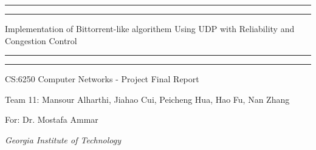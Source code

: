  

\begin{titlepage} %

	\centering %
	
	\scshape %
	
	\vspace*{\baselineskip} %
	
	
	\rule{\textwidth}{1.6pt}\vspace*{-\baselineskip}\vspace*{2pt} %
	\rule{\textwidth}{0.4pt} %
	
	\vspace{0.75\baselineskip} %
	
	{\LARGE Implementation of Bittorrent-like algorithem Using UDP
with Reliability and Congestion Control\\} %
	
	\vspace{0.75\baselineskip} %
	
	\rule{\textwidth}{0.4pt}\vspace*{-\baselineskip}\vspace{3.2pt} %
	\rule{\textwidth}{1.6pt} %
	
	\vspace{2\baselineskip} %
	
	
	CS:6250 Computer Networks - Project Final Report
	
	\vspace*{3\baselineskip} %
	
	
Team 11: Mansour Alharthi, Jiahao Cui, Peicheng Hua, Hao Fu, Nan Zhang	
	
		
	\vspace{2\baselineskip} %
	
	For: Dr. Mostafa Ammar

	
	\vspace{1.5\baselineskip} %
	
	\textit{Georgia Institute of Technology} 



\end{titlepage}
